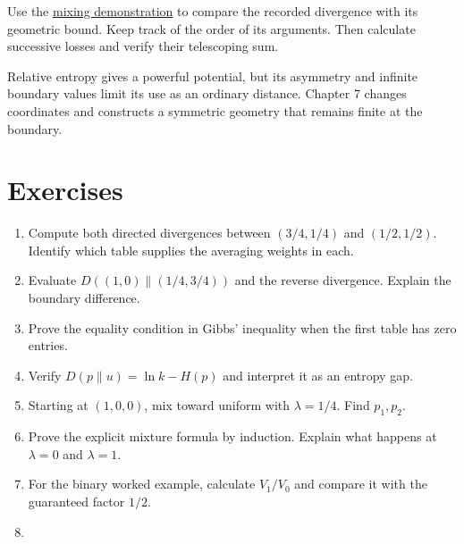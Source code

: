 \documentclass[11pt,oneside,openany]{book}
\theoremstyle{definition}
\theoremstyle{remark}
\newenvironment{exercises}{\begin{enumerate}[label=\thechapter.\arabic*,ref=\thechapter.\arabic*,leftmargin=2.8em,itemsep=6pt]}{\end{enumerate}}
\numberwithin{equation}{chapter}
\begin{document}
Use the \href{https://bobovski66.github.io/IntroDiscreteInfoGeom/demos/week06.html}{mixing demonstration} to compare the recorded divergence with its geometric bound. Keep track of the order of its arguments. Then calculate successive losses and verify their telescoping sum.

Relative entropy gives a powerful potential, but its asymmetry and infinite boundary values limit its use as an ordinary distance. Chapter 7 changes coordinates and constructs a symmetric geometry that remains finite at the boundary.

\section{Exercises}\label{ch06-exercises}

\begin{exercises}

\item 

Compute both directed divergences between \((3/4,1/4)\) and \((1/2,1/2)\). Identify which table supplies the averaging weights in each.

\item 

Evaluate \(D((1,0)\|(1/4,3/4))\) and the reverse divergence. Explain the boundary difference.

\item 

Prove the equality condition in Gibbs' inequality when the first table has zero entries.

\item 

Verify \(D(p\|u)=\ln k-H(p)\) and interpret it as an entropy gap.

\item 

Starting at \((1,0,0)\), mix toward uniform with \(\lambda=1/4\). Find \(p_1,p_2\).

\item 

Prove the explicit mixture formula by induction. Explain what happens at \(\lambda=0\) and \(\lambda=1\).

\item 

For the binary worked example, calculate \(V_1/V_0\) and compare it with the guaranteed factor \(1/2\).

\item 


\end{exercises}
\end{document}
